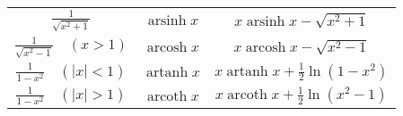 \documentclass[]{article}
\begin{document}
\begin{multicols*}{3}
{\begin{tabular}{c|c|c}
  $\frac{1}{\sqrt {x^2+1}}$& $\operatorname{arsinh} x$ & $x \operatorname{arsinh} x -\sqrt{x^2+1}$\\
  $\frac{1}{\sqrt {x^2-1}} \quad (x>1)$&$\operatorname{arcosh} x$ & $x \operatorname{arcosh} x -\sqrt{x^2-1}$\\
  $\frac{1}{1-x^2} \quad (\left| x \right|<1)$&$\operatorname{artanh} x$ & $x \operatorname{artanh} x +\frac{1}{2}\ln{\left(1-x^2\right)}$\\
  $\frac{1}{1-x^2} \quad (\left| x \right|>1)$&$\operatorname{arcoth} x$ & $x \operatorname{arcoth} x +\frac{1}{2}\ln{\left(x^2-1\right)}$\\ 
\end{tabular}}

\end{multicols*}
\end{document}

